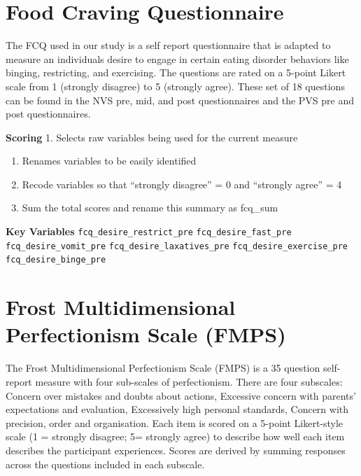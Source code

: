 \documentclass[
]{book}
\begin{document}
\section{Food Craving Questionnaire}\label{food-craving-questionnaire}

The FCQ used in our study is a self report questionnaire that is adapted
to measure an individuals desire to engage in certain eating disorder
behaviors like binging, restricting, and exercising. The questions are
rated on a 5-point Likert scale from 1 (strongly disagree) to 5
(strongly agree). These set of 18 questions can be found in the NVS pre,
mid, and post questionnaires and the PVS pre and post questionnaires.

\textbf{Scoring} 1. Selects raw variables being used for the current measure

\begin{enumerate}
\def\labelenumi{\arabic{enumi}.}
\setcounter{enumi}{1}
\item
  Renames variables to be easily identified
\item
  Recode variables so that ``strongly disagree'' = 0 and ``strongly
  agree'' = 4
\item
  Sum the total scores and rename this summary as fcq\_sum
\end{enumerate}

\textbf{Key Variables} \texttt{fcq\_desire\_restrict\_pre} \texttt{fcq\_desire\_fast\_pre}
\texttt{fcq\_desire\_vomit\_pre} \texttt{fcq\_desire\_laxatives\_pre}
\texttt{fcq\_desire\_exercise\_pre} \texttt{fcq\_desire\_binge\_pre}

\section{Frost Multidimensional Perfectionism Scale (FMPS)}\label{frost-multidimensional-perfectionism-scale-fmps}

The Frost Multidimensional Perfectionism Scale (FMPS) is a 35 question
self-report measure with four sub-scales of perfectionism. There are
four subscales: Concern over mistakes and doubts about actions,
Excessive concern with parents' expectations and evaluation, Excessively
high personal standards, Concern with precision, order and organisation.
Each item is scored on a 5-point Likert-style scale (1 = strongly
disagree; 5= strongly agree) to describe how well each item describes
the participant experiences. Scores are derived by summing responses
across the questions included in each subscale.
\end{document}
